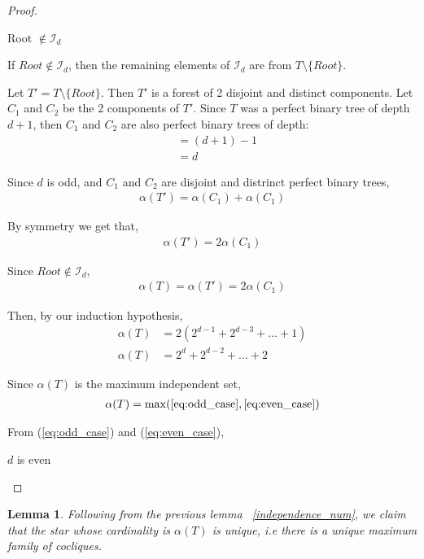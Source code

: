 \documentclass{article}
\newtheorem{lemma}[theorem]{Lemma}
\theoremstyle{definition}
\begin{document}
\begin{proof}
\begin{caseof}
\begin{subcaseof}
			\item Root $\not\in \mathcal{I}_d$

			If $Root \not\in \mathcal{I}_d$, then the remaining elements of $\mathcal{I}_d$ are from $T \setminus \{Root\}$.

			Let $T' = T\setminus\{Root\}$. Then $T'$ is a forest of 2 disjoint and distinct components. Let $C_1$ and $C_2$ be the 2 components of $T'$. Since $T$ was a perfect binary tree of depth $d + 1$, then $C_1$ and $C_2$ are also perfect binary trees of depth:
			\begin{align*}
				 & = (d + 1) - 1 \\
				 & = d
			\end{align*}

			Since $d$ is odd, and $C_1$ and $C_2$ are disjoint and distrinct perfect binary trees,
			\begin{align*}
				\alpha(T') = \alpha(C_1) + \alpha(C_1)
			\end{align*}

			By symmetry we get that,
			\begin{align*}
				\alpha(T') = 2\alpha(C_1)
			\end{align*}

			Since $Root \not\in \mathcal{I}_d$,
			\begin{align*}
				\alpha(T) = \alpha(T') = 2\alpha(C_1)
			\end{align*}

			Then, by our induction hypothesis,
			\begin{align*}
				\alpha(T) & = 2(2^{d - 1} + 2^{d - 3} + \dots + 1)          \\
				\alpha(T) & = 2^d + 2^{d-2} + \dots + 2\label{eq:even_case}
			\end{align*}
		\end{subcaseof}

		Since $\alpha(T)$ is the maximum independent set,
		\begin{align*}
			\alpha(T) = \max(\ref{eq:odd_case}, \ref{eq:even_case})
		\end{align*}

		From (\ref{eq:odd_case}) and (\ref{eq:even_case}),

		\item $d$ is even
	\end{caseof}
\end{proof}

\begin{lemma}
	Following from the previous lemma ~\ref{independence_num}, we claim that the star whose cardinality is $\alpha(T)$ is unique, i.e there is a unique maximum family of cocliques.
\end{lemma}
\end{document}
